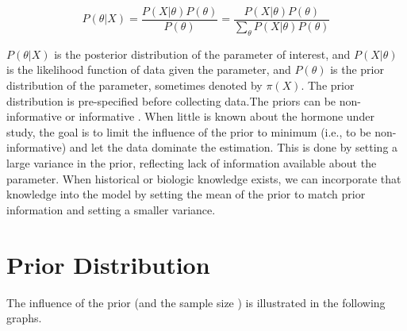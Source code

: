 \documentclass[11pt]{book}
\newcommand{\beq}{\begin{equation}}
\newcommand{\eeq}{\end{equation}}
\begin{document}
\beq
P(\theta|X)=\frac{P(X|\theta)P(\theta)}{P(\theta)} = \frac{P(X|\theta)P(\theta)}{\sum_\theta P(X|\theta)P(\theta)}
\eeq

$P(\theta|X)$ is the posterior distribution of the parameter of interest, and  $P(X|\theta)$ is the likelihood function of data given the parameter, and  $P(\theta)$ is the prior distribution of the parameter, sometimes denoted by $\pi(X)$. The prior distribution is pre-specified before collecting data.The priors can be non-informative or informative .  When little is known about the hormone under study, the goal is to limit the influence of the prior to minimum (i.e., to be non-informative) and let the data dominate the estimation.  This is done by setting a large variance in the prior, reflecting lack of information available about the parameter.  When historical or biologic knowledge exists, we can incorporate that knowledge into the model by setting the mean of the prior to match prior information and setting a smaller variance.

\section{Prior Distribution}
The influence of the prior (and the sample size ) is illustrated in the following graphs.
\end{document}
